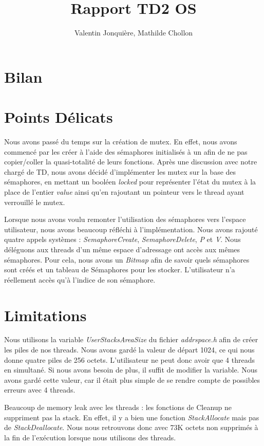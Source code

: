 \documentclass{article}
\author{
    Valentin Jonquière,
    Mathilde Chollon
}
\title{Rapport TD2 OS}
\begin{document}
\maketitle

\pagebreak

\tableofcontents

\pagebreak

\section{Bilan}

\section{Points Délicats}
Nous avons passé du temps sur la création de mutex. En effet, nous avons commencé par les créer à l'aide
des sémaphores initialisés à un afin de ne pas copier/coller la quasi-totalité de leurs fonctions. Après
une discussion avec notre chargé de TD, nous avons décidé d'implémenter les mutex sur la base des sémaphores,
en mettant un booléen \textit{locked} pour représenter l'état du mutex à la place de l'entier \textit{value} ainsi
qu'en rajoutant un pointeur vers le thread ayant verrouillé le mutex.

Lorsque nous avons voulu remonter l'utilisation des sémaphores vers l'espace utilisateur, nous avons beaucoup réfléchi à l'implémentation.
Nous avons rajouté quatre appels systèmes : \textit{SemaphoreCreate}, \textit{SemaphoreDelete}, \textit{P} et \textit{V}. Nous déléguons aux
threads d'un même espace d'adressage ont accès aux mêmes sémaphores. Pour cela, nous avons un \textit{Bitmap} afin de savoir quels sémaphores sont 
créés et un tableau de Sémaphores pour les stocker. L'utilisateur n'a réellement accès qu'à l'indice de son sémaphore.

\section{Limitations}
Nous utilisons la variable \textit{UserStacksAreaSize} du fichier \textit{addrspace.h} afin de créer les piles de nos threads. Nous avons gardé la valeur de départ 1024, 
ce qui nous donne quatre piles de 256 octets. L'utilisateur ne peut donc avoir que 4 threads en simultané. Si nous avons besoin de plus, il suffit de modifier la variable. 
Nous avons gardé cette valeur, car il était plus simple de se rendre compte de possibles erreurs avec 4 threads.

Beaucoup de memory leak avec les threads : les fonctions de Cleanup ne suppriment pas la stack.
En effet, il y a bien une fonction \textit{StackAllocate} mais pas de \textit{StackDeallocate}.
Nous nous retrouvons donc avec 73K octets non supprimés à la fin de l'exécution lorsque nous utilisons des threads.
\end{document}
